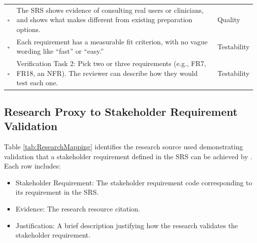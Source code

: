 \documentclass[10pt,titlepage]{article}
\newcommand{\chk}{$\square$}
\begin{document}
\begin{longtable}{@{}>{\raggedright\arraybackslash}p{} >{\raggedright\arraybackslash}p{} >{\raggedright\arraybackslash}p{}@{}}
\chk & The SRS shows evidence of consulting real users or clinicians, and shows what makes \progname{} 
different from existing preparation options.
& Quality \\

\chk & Each requirement has a measurable fit criterion, with no vague wording like “fast” or “easy.”
& Testability \\

\chk & Verification Task 2: Pick two or three requirements (e.g., FR7, FR18, an NFR). The 
reviewer can describe how they would test each one.
& Testability \\

\end{longtable}

\subsection{Research Proxy to Stakeholder Requirement Validation}\label{sec:ResearchValidation}

Table \ref{tab:ResearchMapping} identifies the research source used demonstrating validation that a stakeholder requirement defined in the SRS can be 
achieved by \progname{}. Each row includes:
\begin{itemize}
  \item Stakeholder Requirement: The stakeholder requirement code corresponding to its requirement in the SRS.
  \item Evidence: The research resource citation.
  \item Justification: A brief description justifying how the research validates the stakeholder requirement.
\end{itemize}
\end{document}
